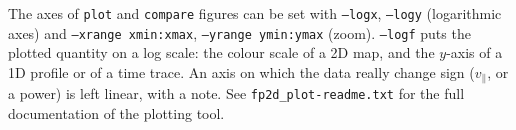 \documentclass[11pt,a4paper]{article}
\newcommand{\vpa}{v_\parallel}
\begin{document}
The axes of \texttt{plot} and \texttt{compare} figures can be set with
\texttt{--logx}, \texttt{--logy} (logarithmic axes) and
\texttt{--xrange xmin:xmax}, \texttt{--yrange ymin:ymax} (zoom).
\texttt{--logf} puts the plotted quantity on a log scale: the colour scale of a
2D map, and the $y$-axis of a 1D profile or of a time trace.  An axis on which
the data really change sign ($\vpa$, or a power) is left linear, with a note.
See \texttt{fp2d\_plot-readme.txt} for the full documentation of the
plotting tool.
\end{document}
